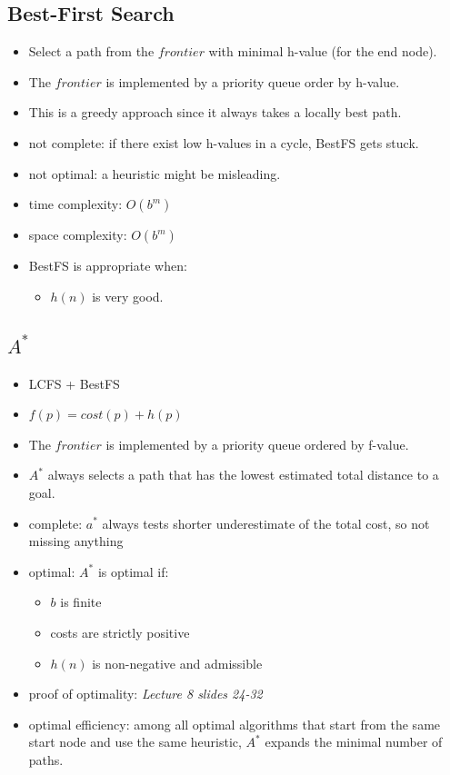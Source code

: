 \documentclass{article}
\begin{document}
\subsection{Best-First Search}

\begin{itemize}
    \item Select a path from the $frontier$ with minimal h-value (for the end node).
    \item The $frontier$ is implemented by a priority queue order by h-value.
    \item This is a greedy approach since it always takes a locally best path.
    \item not complete: if there exist low h-values in a cycle, BestFS gets stuck.
    \item not optimal: a heuristic might be misleading.
    \item time complexity: $O(b^m)$
    \item space complexity: $O(b^m)$
    \item BestFS is appropriate when:
        \begin{itemize}
            \item $h(n)$ is very good.
        \end{itemize}
\end{itemize}

\subsection{$A^{*}$}

\begin{itemize}
    \item LCFS + BestFS
    \item $f(p) = cost(p) + h(p)$
    \item The $frontier$ is implemented by a priority queue ordered by f-value.
    \item $A^{*}$ always selects a path that has the lowest estimated total distance to a goal.
    \item complete: $a^{*}$ always tests shorter underestimate of the total cost, so not missing anything
    \item optimal: $A^{*}$ is optimal if:
        \begin{itemize}
            \item $b$ is finite
            \item costs are strictly positive
            \item $h(n)$ is non-negative and admissible
        \end{itemize}
    \item proof of optimality: \textit{Lecture 8 slides 24-32}
    \item optimal efficiency: among all optimal algorithms that start from the same start node and use the same heuristic, $A^{*}$ expands the minimal number of paths.
\end{itemize}
\end{document}
